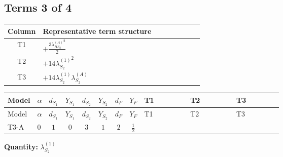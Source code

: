 \documentclass[8pt]{article}
\begin{document}
\begin{landscape}
\subsection*{Terms 3 of 4}
\begin{center}
\begin{tabular}{@{}c >{\raggedright\arraybackslash}p{0.82\linewidth}@{}}
\toprule
Column & Representative term structure \\
\midrule
T1 & \(\displaystyle +\frac{3 {\lambda_{HS_2}^{(A)}}^2}{2}\) \\
\midrule
T2 & \(\displaystyle +14 {\lambda_{S_2}^{(1)}}^2\) \\
\midrule
T3 & \(\displaystyle +14 {\lambda_{S_2}^{(1)}} {\lambda_{S_2}^{(A)}}\) \\
\midrule
\bottomrule
\end{tabular}
\end{center}
\smallskip
\tiny
\begin{longtable}{@{}llcccccc >{\raggedright\arraybackslash}p{0.21\linewidth} >{\raggedright\arraybackslash}p{0.21\linewidth} >{\raggedright\arraybackslash}p{0.21\linewidth}@{}}
\toprule
Model & $\alpha$ & $d_{S_1}$ & $Y_{S_1}$ & $d_{S_2}$ & $Y_{S_2}$ & $d_F$ & $Y_F$ & T1 & T2 & T3 \\
\midrule
\endfirsthead
\toprule
Model & $\alpha$ & $d_{S_1}$ & $Y_{S_1}$ & $d_{S_2}$ & $Y_{S_2}$ & $d_F$ & $Y_F$ & T1 & T2 & T3 \\
\midrule
\endhead
T3-A & $0$ & $1$ & $0$ & $3$ & $1$ & $2$ & $\frac{1}{2}$ & \scriptsize\adjustbox{max width=\linewidth}{$\begin{gathered} +\frac{3 {\lambda_{HS_2}^{(A)}}^2}{2}\end{gathered}$} & \scriptsize\adjustbox{max width=\linewidth}{$\begin{gathered} +14 {\lambda_{S_2}^{(1)}}^2\end{gathered}$} & \scriptsize\adjustbox{max width=\linewidth}{$\begin{gathered} +14 {\lambda_{S_2}^{(1)}} {\lambda_{S_2}^{(A)}}\end{gathered}$} \\
\midrule
\bottomrule
\end{longtable}
\clearpage
\noindent\textbf{Quantity: }$\lambda_{S_2}^{(1)}$\par\smallskip

\end{landscape}
\end{document}
